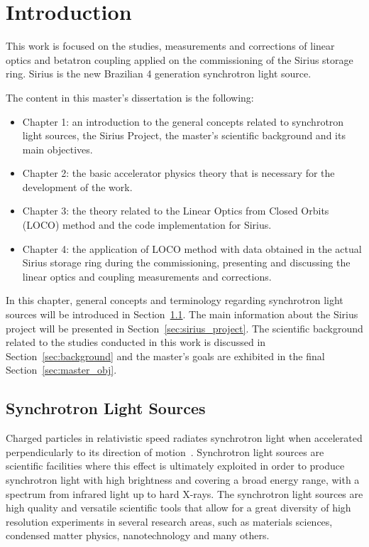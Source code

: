 \chapter{Introduction} \label{chap:intro}
This work is focused on the studies, measurements and corrections of linear optics and betatron coupling applied on the commissioning of the Sirius storage ring. Sirius is the new Brazilian 4 generation synchrotron light source. 

The content in this master's dissertation is the following:
\begin{itemize}
    \item Chapter 1: an introduction to the general concepts related to synchrotron light sources, the Sirius Project, the master's scientific background and its main objectives.
    \item Chapter 2: the basic accelerator physics theory that is necessary for the development of the work.
    \item Chapter 3: the theory related to the Linear Optics from Closed Orbits (LOCO) method and the code implementation for Sirius.
    \item Chapter 4: the application of LOCO method with data obtained in the actual Sirius storage ring during the commissioning, presenting and discussing the linear optics and coupling measurements and corrections.
\end{itemize}

In this chapter, general concepts and terminology regarding synchrotron light sources will be introduced in Section~\ref{sec:sls}. The main information about the Sirius project will be presented in Section~\ref{sec:sirius_project}. The scientific background related to the studies conducted in this work is discussed in Section~\ref{sec:background} and the master's goals are exhibited in the final Section~\ref{sec:master_obj}.
\section{Synchrotron Light Sources}\label{sec:sls}
Charged particles in relativistic speed radiates synchrotron light when accelerated perpendicularly to its direction of motion~\cite{jackson}. Synchrotron light sources are scientific facilities where this effect is ultimately exploited in order to produce synchrotron light with high brightness and covering a broad energy range, with a spectrum from infrared light up to hard X-rays. The synchrotron light sources are high quality and versatile scientific tools that allow for a great diversity of high resolution experiments in several research areas, such as materials sciences, condensed matter physics, nanotechnology and many others.

